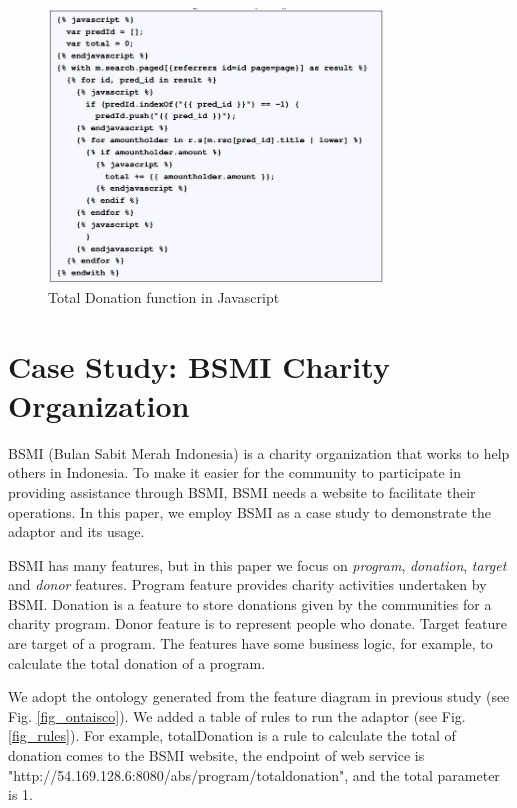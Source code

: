 \documentclass[conference]{IEEEtran}
\begin{document}
\begin{figure}[h]
\centering
\includegraphics[width=3.5in]{totaldonationjs}

\caption{Total Donation function in Javascript}
\label{samplejs}
\end{figure}


\section{Case Study: BSMI Charity Organization} \label{casestudy}

BSMI (Bulan Sabit Merah Indonesia) is a charity organization that works to help others in Indonesia. To make it easier for the community to participate in providing assistance through BSMI, BSMI needs a website to facilitate their operations. In this paper, we employ BSMI as a case study to demonstrate the adaptor and its usage. 

BSMI has many features, but in this paper we focus on \textit{program}, \textit{donation}, \textit{target} and \textit{donor} features. Program feature provides charity activities undertaken by BSMI. Donation is a feature to store donations given by the communities for a charity program. Donor feature is to represent people who donate. Target feature are target of a program. The features have some business logic, for example, to calculate the total donation of a program. 

We adopt the ontology generated from the feature diagram in previous study \cite{bravyto} (see Fig. \ref{fig_ontaisco}). We added a table of rules to run the adaptor (see Fig. \ref{fig_rules}). For example, totalDonation is a rule to calculate the total of donation comes to the BSMI website, the endpoint of web service is "http://54.169.128.6:8080/abs/program/totaldonation", and the total parameter is 1. 
\end{document}
